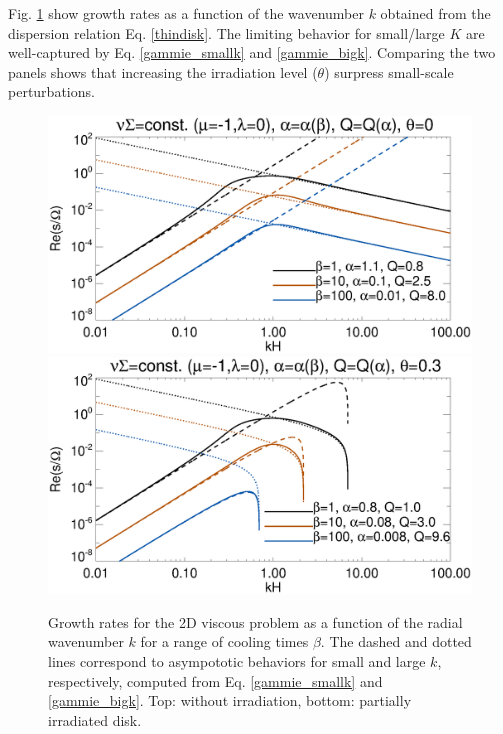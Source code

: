 Fig. \ref{gammie_rate_plot} show growth rates as a function of the
wavenumber $k$ obtained from the dispersion relation
Eq. \ref{thindisk}. The limiting behavior for small/large $K$ are
well-captured by Eq. \ref{gammie_smallk} and
\ref{gammie_bigk}. Comparing the two panels shows that increasing the
irradiation level ($\theta$) surpress  
small-scale perturbations.    

\begin{figure}
  \includegraphics[width=\linewidth,clip=true,trim=0cm 1.5cm 0.4cm
    0.0cm]{figures/viscsg_modes}\\
  \includegraphics[width=\linewidth,clip=true,trim=0cm 0cm 0.4cm
    0.0cm]{figures/viscsg_modes_theta0d3}
  \caption{Growth rates for the 2D viscous problem as a function of
    the radial wavenumber $k$ for a range of cooling times
    $\beta$. The dashed and dotted lines correspond to asympototic
    behaviors for small and large $k$, respectively, computed from
    Eq. \ref{gammie_smallk} and \ref{gammie_bigk}. Top: without
    irradiation, bottom: partially irradiated disk. 
    \label{gammie_rate_plot}}
\end{figure}

